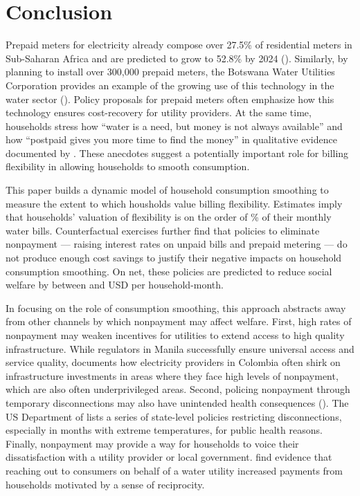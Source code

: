 \documentclass[12pt]{article}
\begin{document}

\section{Conclusion}\label{section:conclusion}

Prepaid meters for electricity already compose over 27.5\% of residential meters in Sub-Saharan Africa and are predicted to grow to 52.8\% by 2024 (\cite{northeast2014}).  Similarly, by planning to install over 300,000 prepaid meters, the Botswana Water Utilities Corporation provides an example of the growing use of this technology in the water sector (\cite{heymans2014limits}).  Policy proposals for prepaid meters often emphasize how this technology ensures cost-recovery for utility providers.  At the same time, households stress how ``water is a need, but money is not always available'' and  how ``postpaid gives you more time to find the money'' in qualitative evidence documented by \cite{heymans2014limits}.  These anecdotes suggest a potentially important role for billing flexibility in allowing households to smooth consumption.  

This paper builds a dynamic model of household consumption smoothing to measure the extent to which housholds value billing flexibility.  Estimates imply that households' valuation of flexibility is on the order of \unskip\% of their monthly water bills.  Counterfactual exercises further find that policies to eliminate nonpayment --- raising interest rates on unpaid bills and prepaid metering ---  do not produce enough cost savings to justify their negative impacts on household consumption smoothing.  On net, these policies are predicted to reduce social welfare by between  and USD per household-month.  

In focusing on the role of consumption smoothing, this approach abstracts away from other channels by which nonpayment may affect welfare.  First, high rates of nonpayment may weaken incentives for utilities to extend access to high quality infrastructure.  While regulators in Manila successfully ensure universal access and service quality, \cite{mcrae2015infrastructure} documents how electricity providers in Colombia often shirk on infrastructure investments in areas where they face high levels of nonpayment, which are also often underprivileged areas.  Second, policing nonpayment through temporary disconnections may also have unintended health consequences (\cite{franklin2017}).  The US Department of \cite{liheap} lists a series of state-level policies restricting disconnections, especially in months with extreme temperatures, for public health reasons.  Finally, nonpayment may provide a way for households to voice their dissatisfaction with a utility provider or local government.  \cite{szabo2015reducing} find evidence that reaching out to consumers on behalf of a water utility increased payments from households motivated by a sense of reciprocity.  
\end{document}
